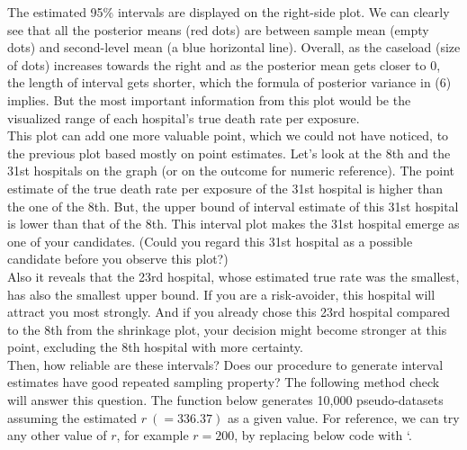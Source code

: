 \documentclass[article]{jss}
\begin{document}
The estimated 95\% intervals are displayed on the right-side plot. We can clearly see that all the posterior means (red dots) are between sample mean (empty dots) and second-level mean (a blue horizontal line). Overall, as the caseload (size of dots) increases towards the right and as the posterior mean gets closer to 0, the length of interval gets shorter, which the formula of posterior variance in (6) implies. But the most important information from this plot would be the visualized range of each hospital's true death rate per exposure. 
\\

This plot can add one more valuable point, which we could not have noticed, to the previous plot based mostly on point estimates. Let's look at the 8th and the 31st hospitals on the graph (or on the outcome for numeric reference). The point estimate of the true death rate per exposure of the 31st hospital is higher than the one of the 8th. But, the upper bound of interval estimate of this 31st hospital is lower than that of the 8th. This interval plot makes the 31st hospital emerge as one of your candidates. (Could you regard this 31st hospital as a possible candidate before you observe this plot?)
\\

Also it reveals that the 23rd hospital, whose estimated true rate was the smallest, has also the smallest upper bound. If you are a risk-avoider, this hospital will attract you most strongly. And if you already chose this 23rd hospital compared to the 8th from the shrinkage plot, your decision might become stronger at this point, excluding the 8th hospital with more certainty. 
\\

Then, how reliable are these intervals? Does our procedure to generate interval estimates have good repeated sampling property? The following method check will answer this question. The  function below generates 10,000 pseudo-datasets assuming the estimated $r~(=336.37)$ as a given value. For reference, we can try any other value of $r$, for example $r=200$, by replacing below code with `.
\end{document}
